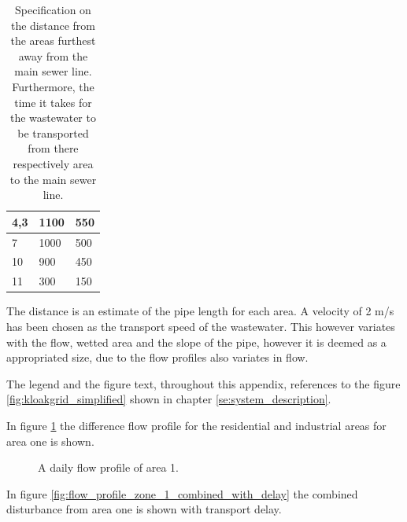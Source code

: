 \begin{table}[H]
\begin{tabular}{|l|l|l|}
4,3           & 1100                                                                                                             & 550                                                                                                          \\ \hline
7             & 1000                                                                                                             & 500                                                                                                          \\ \hline
10            & 900                                                                                                              & 450                                                                                                          \\ \hline
11            & 300                                                                                                              & 150                                                                                                          \\ \hline
\end{tabular}
\caption{Specification on the distance from the areas furthest away from the main sewer line. Furthermore, the time it takes for the wastewater to be transported from there respectively area to the main sewer line. }
\label{tab:table_areas}
\end{table} 

The distance is an estimate of the pipe length for each area. A velocity of 2 m/s has been chosen as the transport speed of the wastewater. This however variates with the flow, wetted area and the slope of the pipe, however it is deemed as a appropriated size, due to the flow profiles also variates in flow.  

The legend and the figure text, throughout this appendix, references to the figure \ref{fig:kloakgrid_simplified} shown in chapter \ref{se:system_description}. 

In figure \ref{fig:APP_flow_profile_thulevej} the difference flow profile for the residential and industrial areas for area one is shown.
\begin{figure}[H]
\centering

\caption{A daily flow profile of area 1.}
\label{fig:APP_flow_profile_thulevej}
\end{figure} 

In figure \ref{fig:flow_profile_zone_1_combined_with_delay} the combined disturbance from area one is shown with transport delay. 


